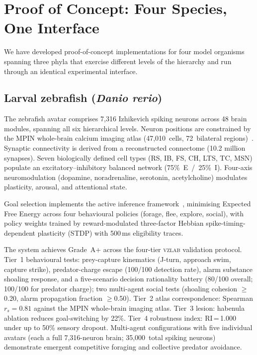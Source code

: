 \documentclass[12pt,a4paper]{article}
\begin{document}
\section*{Proof of Concept: Four Species, One Interface}

We have developed proof-of-concept implementations for four model
organisms spanning three phyla that exercise different levels of the
hierarchy and run through an identical experimental interface.

\subsection*{Larval zebrafish (\textit{Danio rerio})}

The zebrafish avatar comprises 7,316 Izhikevich spiking neurons
across 48 brain modules, spanning all six hierarchical levels.
Neuron positions are constrained by the MPIN whole-brain calcium
imaging atlas (47,010~cells, 72~bilateral regions)~\cite{kunst2019}.
Synaptic connectivity is derived from a reconstructed connectome
(10.2 million synapses).
Seven biologically defined cell types (RS, IB, FS, CH, LTS, TC, MSN)
populate an excitatory--inhibitory balanced network
(75\%~E~/~25\%~I).
Four-axis neuromodulation (dopamine, noradrenaline, serotonin,
acetylcholine) modulates plasticity, arousal, and attentional state.

Goal selection implements the active inference framework~\cite{friston2017},
minimising Expected Free Energy across four behavioural policies
(forage, flee, explore, social), with policy weights trained by
reward-modulated three-factor Hebbian spike-timing-dependent plasticity
(STDP) with 500\,ms eligibility traces.

The system achieves Grade~A+ across the four-tier \textsc{vzlab}
validation protocol.
Tier~1 behavioural tests: prey-capture kinematics (J-turn, approach
swim, capture strike), predator-charge escape (100/100 detection rate),
alarm substance shoaling response, and a five-scenario decision
rationality battery (80/100 overall; 100/100 for predator charge);
two multi-agent social tests (shoaling cohesion $\geq$0.20, alarm
propagation fraction $\geq$0.50).
Tier~2 atlas correspondence: Spearman $r_s = 0.81$ against the MPIN
whole-brain imaging atlas.
Tier~3 lesion: habenula ablation reduces goal-switching by 22\%.
Tier~4 robustness index: RI\,=\,1.000 under up to 50\% sensory dropout.
Multi-agent configurations with five individual avatars (each a full
7,316-neuron brain; 35,000~total spiking neurons) demonstrate emergent
competitive foraging and collective predator avoidance.
\end{document}
